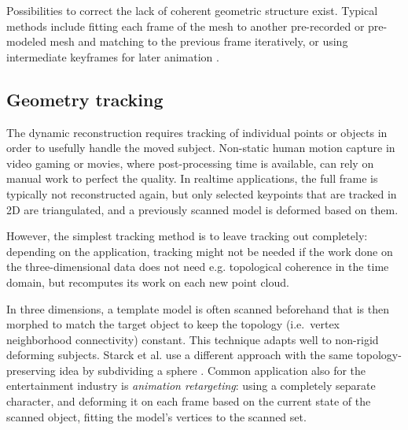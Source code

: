 Possibilities to correct the lack of coherent geometric structure exist.
Typical methods include fitting each frame of the mesh to another pre-recorded or pre-modeled mesh \cite{bickel2007multi,bradley2010high,li2009robust,zhang2007spacetime} and matching to the previous frame iteratively, or using intermediate keyframes for later animation \cite{beeler2011high}.

\subsection{Geometry tracking} %


The dynamic reconstruction requires tracking of individual points or objects in order to usefully handle the moved subject.
Non-static human motion capture in video gaming or movies, where post-processing time is available, can rely on manual work to perfect the quality.
In realtime applications, the full frame is typically not reconstructed again, but only selected keypoints that are tracked in 2D are triangulated, and a previously scanned model is deformed based on them.

However, the simplest tracking method is to leave tracking out completely: depending on the application, tracking might not be needed if the work done on the three-dimensional data does not need e.g. topological coherence in the time domain, but recomputes its work on each new point cloud.


In three dimensions, a template model is often scanned beforehand that is then morphed to match the target object to keep the topology (i.e.~vertex neighborhood connectivity) constant.
This technique adapts well to non-rigid deforming subjects. \cite{bojsen2012tracking,li2009robust}
Starck et al. use a different approach with the same topology-preserving idea by subdividing a sphere \cite{starck2007surface}.
Common application also for the entertainment industry is \emph{animation retargeting}: using a completely separate character, and deforming it on each frame based on the current state of the scanned object, fitting the model's vertices to the scanned set. \cite{sumner2004deformation}

